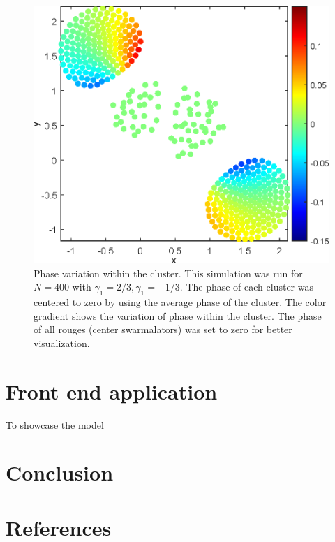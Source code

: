 \documentclass[twocolumn,10pt]{asme2ej}
\begin{document}
{    \begin{figure}[h!]
        \includegraphics[width = \linewidth]{phaseVar.eps}
        \caption{Phase variation within the cluster. This simulation was run for \(N = 400\) with \(\gamma_1 = 2/3,\gamma_1 = -1/3\). The phase of each cluster was centered to zero by using the average phase of the cluster. The color gradient shows the variation of phase within the cluster. The phase of all rouges (center swarmalators) was set to zero for better visualization. }
        \label{fig:phaseVar}
    \end{figure}
}
\noindent


\section{Front end application}
{
    To showcase the model 
}
\section{Conclusion}


\section{References}
\end{document}
